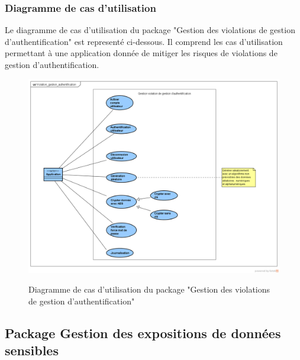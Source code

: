 \subsubsection{Diagramme de cas d'utilisation}
Le diagramme de cas d'utilisation du package "Gestion des violations de gestion d'authentification" est representé ci-dessous. Il comprend les cas d'utilisation permettant à une application donnée de mitiger les risques de violations de gestion d'authentification.\\ 
\begin{figure}[H]
	\centering
	\begin{minipage}{12cm}
		\centering
		{\includegraphics[height=0.30\textheight]{fig/Violation-gestion-authentification-use-case-diagram.png}}
	\end{minipage}
	\caption{Diagramme de cas d'utilisation du package "Gestion des violations de gestion d'authentification"}
	\label{fig:7.3}
\end{figure}

\subsection{Package Gestion des expositions de données sensibles}

